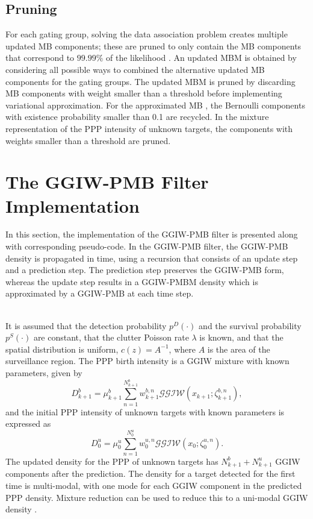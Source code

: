 \subsection{Pruning}
For each gating group, solving the data association problem creates multiple updated MB components; these are pruned to only contain the MB components that correspond to $99.99\%$ of the likelihood \cite{pmbmextended2}. An updated MBM is obtained by considering all possible ways to combined the alternative updated MB components for the gating groups. The updated MBM is pruned by discarding MB components with weight smaller than a threshold before implementing variational approximation. For the approximated MB , the Bernoulli components with existence probability smaller than 0.1 are recycled. In the mixture representation of the PPP intensity of unknown targets, the components with weights smaller than a threshold are pruned.  



\section{The GGIW-PMB Filter Implementation}
In this section, the implementation of the GGIW-PMB filter is presented along with corresponding pseudo-code. In the GGIW-PMB filter, the GGIW-PMB density is propagated in time, using a recursion that consists of an update step and a prediction step. The prediction step preserves the GGIW-PMB form, whereas the update step results in a GGIW-PMBM density which is approximated by a GGIW-PMB at each time step. 

~\\
It is assumed that the detection probability $p^D(\cdot)$ and the survival probability $p^S(\cdot)$ are constant, that the clutter Poisson rate $\lambda$ is known, and that the spatial distribution is uniform, $c(z) = A^{-1}$, where $A$ is the area of the surveillance region. The PPP birth intensity is a GGIW mixture with known parameters, given by
\begin{equation}
    D^b_{k+1} = \mu^b_{k+1}\sum^{N^b_{k+1}}_{n=1}w^{b,n}_{k+1}\mathcal{GGIW}(x_{k+1};\zeta^{b,n}_{k+1}),
\end{equation}
and the initial PPP intensity of unknown targets with known parameters is expressed as
\begin{equation}
    D^u_{0} = \mu^u_{0}\sum^{N^u_{0}}_{n=1}w^{u,n}_{0}\mathcal{GGIW}(x_{0};\zeta^{u,n}_{0}).
\end{equation}
The updated density for the PPP of unknown targets has $N^b_{k+1}+N^u_{k+1}$ GGIW components after the prediction. The density for a target detected for the first time is multi-modal, with one mode for each GGIW component in the predicted PPP density. Mixture reduction can be used to reduce this to a uni-modal GGIW density \cite{phdextended,gammareduction}. 

